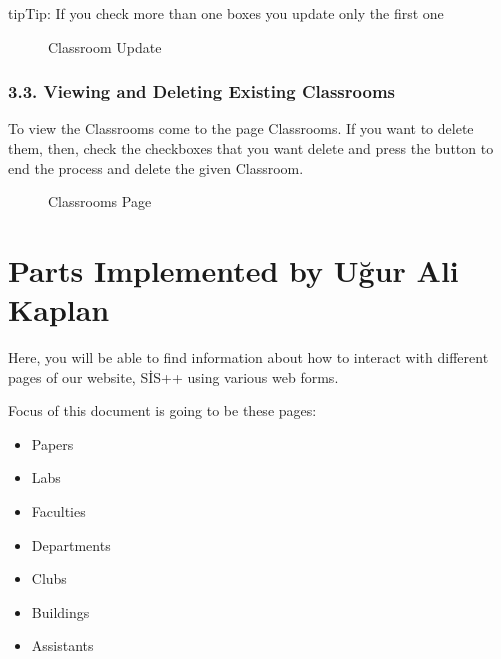 \documentclass[letterpaper,10pt,english]{sphinxmanual}
\begin{document}
\begin{sphinxadmonition}{tip}{Tip:}
If you check more than one boxes you update only the first one
\end{sphinxadmonition}

\begin{figure}[htbp]
\centering
\capstart

\noindent{}
\caption{Classroom Update}\label{\detokenize{user/berkay:id9}}\end{figure}


\subsubsection{3.3. Viewing and Deleting Existing Classrooms}
\label{\detokenize{user/berkay:viewing-and-deleting-existing-classrooms}}
To view the Classrooms come to the page Classrooms. If you want to delete them,
then, check the checkboxes that you want delete and press the  button to
end the process and delete the given Classroom.

\begin{figure}[htbp]
\centering
\capstart

\noindent{}
\caption{Classrooms Page}\label{\detokenize{user/berkay:id10}}\end{figure}


\section{Parts Implemented by Uğur Ali Kaplan}
\label{\detokenize{user/kaplan:parts-implemented-by-ugur-ali-kaplan}}\label{\detokenize{user/kaplan::doc}}
Here, you will be able to find information about how to interact
with different pages of our website, SİS++ using various web forms.

Focus of this document is going to be these pages:
\begin{itemize}
\item {} 
Papers

\item {} 
Labs

\item {} 
Faculties

\item {} 
Departments

\item {} 
Clubs

\item {} 
Buildings

\item {} 
Assistants

\end{itemize}
\end{document}
